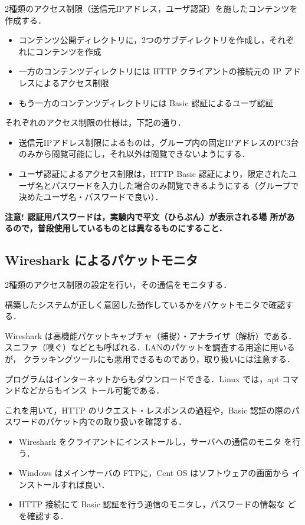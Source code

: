 2種類のアクセス制限（送信元IPアドレス，ユーザ認証）を施したコンテンツを作成する．

\begin{itemize}
 \item コンテンツ公開ディレクトリに，2つのサブディレクトリを作成し，それぞれにコンテンツを作成
 \item 一方のコンテンツディレクトリには HTTP クライアントの接続元の IP アドレスによるアクセス制限
 \item もう一方のコンテンツディレクトリには Basic 認証によるユーザ認証
\end{itemize}

それぞれのアクセス制限の仕様は，下記の通り．
\begin{itemize}
 \item 送信元IPアドレス制限によるものは，グループ内の固定IPアドレスのPC3台のみから閲覧可能にし，それ以外は閲覧できないようにする．
 \item ユーザ認証によるアクセス制限は，HTTP Basic 認証により，限定されたユーザ名とパスワードを入力した場合のみ閲覧できるようにする（グループで決めたユーザ名・パスワードで良い）．
\end{itemize}



\textbf{注意! 認証用パスワードは，実験内で平文（ひらぶん）が表示される場
所があるので，普段使用しているものとは異なるものにすること．}

\subsection*{Wireshark によるパケットモニタ}

2種類のアクセス制限の設定を行い，その通信をモニタする．

構築したシステムが正しく意図した動作しているかをパケットモニタで確認する．

Wireshark は高機能パケットキャプチャ（捕捉）・アナライザ（解析）である．
スニファ（嗅ぐ）などとも呼ばれる．LANのパケットを調査する用途に用いるが，
クラッキングツールにも悪用できるものであり，取り扱いには注意する．

プログラムはインターネットからもダウンロードできる．Linux では，apt コマンドなどからもインス
トール可能である．

これを用いて，HTTP のリクエスト・レスポンスの過程や，Basic 認証の際のパ
スワードのパケット内での取り扱いを確認する．

 \begin{itemize}
 \item Wireshark をクライアントにインストールし，サーバへの通信のモニタ
       を行う．
 \item Windows はメインサーバの FTPに，Cent OS はソフトウェアの画面から
       インストールすれば良い．
 \item HTTP 接続にて Basic 認証を行う通信のモニタし，パスワードの情報な
       どを確認する．
 \end{itemize}


